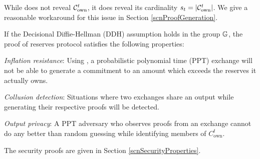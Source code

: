 While \RPlus does not reveal $\mathcal{C}_{\text{own}}^t$, it does reveal its cardinality $s_t = \left| \mathcal{C}_{\text{own}}^t \right|$.
We give a reasonable workaround for this issue in Section \ref{scnProofGeneration}.



If the Decisional Diffie-Hellman (DDH) assumption holds in the group $\mathbb{G}$, the \RPlus proof of reserves protocol satisfies the following properties:
\pointsStart
\item \textit{Inflation resistance}: Using \RBw, a probabilistic polynomial time (\textsf{PPT}) exchange will not be able to generate a commitment to an amount which exceeds the reserves it actually owns.%
\item \textit{Collusion detection}: Situations where two exchanges share an output while generating their respective \RPlus proofs will be detected.
\item \textit{Output privacy}: A \textsf{PPT} adversary who observes \RPlus proofs from an exchange cannot do any better than random guessing while identifying members of $C_{\text{own}}^t$.
\pointsEnd

The security proofs are given in Section \ref{scnSecurityProperties}.

